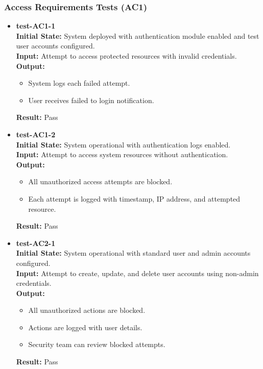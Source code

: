 \documentclass[12pt, titlepage]{article}
\begin{document}
\subsubsection{Access Requirements Tests (AC1)} \label{section:4.10.1}

\begin{itemize}
\item \textbf{test-AC1-1} \label{test-AC1-1} \\
\textbf{Initial State:} System deployed with authentication module enabled and test user accounts configured. \\
\textbf{Input:} Attempt to access protected resources with invalid credentials. \\
\textbf{Output:}
\begin{itemize}
\item System logs each failed attempt.
\item User receives failed to login notification.
\end{itemize}
\textbf{Result:} Pass \\

\item \textbf{test-AC1-2} \label{test-AC1-2} \\
\textbf{Initial State:} System operational with authentication logs enabled. \\
\textbf{Input:} Attempt to access system resources without authentication. \\
\textbf{Output:} 
\begin{itemize}
    \item All unauthorized access attempts are blocked.
    \item Each attempt is logged with timestamp, IP address, and attempted resource.
\end{itemize}
\textbf{Result:} Pass \\
\end{itemize}

\begin{itemize}
\item \textbf{test-AC2-1} \label{test-AC2-1} \\
\textbf{Initial State:} System operational with standard user and admin accounts configured. \\
\textbf{Input:} Attempt to create, update, and delete user accounts using non-admin credentials. \\
\textbf{Output:}
\begin{itemize}
\item All unauthorized actions are blocked.
\item Actions are logged with user details.
\item Security team can review blocked attempts.
\end{itemize}
\textbf{Result:} Pass \\
\end{itemize}
\end{document}
